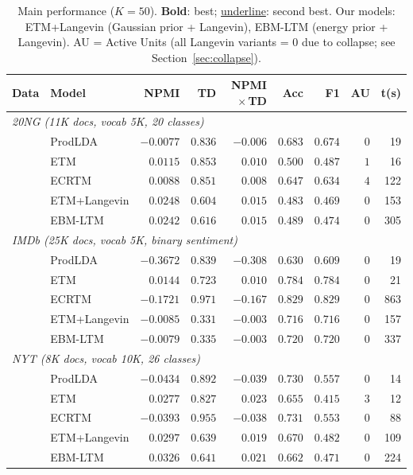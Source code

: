 \documentclass[10pt]{article}
\newcommand{\best}[1]{\textbf{#1}}
\newcommand{\second}[1]{\underline{#1}}
\begin{document}
\begin{table}[t]
\centering
\caption{Main performance ($K=50$). \best{Bold}: best; \second{underline}: second best.
Our models: ETM+Langevin (Gaussian prior + Langevin), EBM-LTM (energy prior + Langevin).
AU = Active Units (all Langevin variants = 0 due to collapse; see Section~\ref{sec:collapse}).}
\label{tab:main}
\setlength{\tabcolsep}{3.5pt}
\small
\begin{tabular}{llrrrrrrr}
\hline
\textbf{Data} & \textbf{Model} &
    \textbf{NPMI} & \textbf{TD} & \textbf{NPMI$\!\times\!$TD} &
    \textbf{Acc} & \textbf{F1} & \textbf{AU} & \textbf{t(s)} \\
\hline
\multicolumn{9}{l}{\textit{20NG (11K docs, vocab 5K, 20 classes)}} \\
  & ProdLDA      & $-0.0077$ & \second{$0.836$} & $-0.006$ & \best{$0.683$} & \best{$0.674$} & 0 & 19 \\
  & ETM          & $0.0115$  & \best{$0.853$}   & $0.010$  & $0.500$ & $0.487$ & \second{$1$} & 16 \\
  & ECRTM        & $0.0088$  & $0.851$ & $0.008$  & \second{$0.647$} & \second{$0.634$} & \best{$4$} & 122 \\
  & ETM+Langevin & \best{$0.0248$} & $0.604$ & \best{$0.015$} & $0.483$ & $0.469$ & 0 & 153 \\
  & EBM-LTM      & \second{$0.0242$} & \second{$0.616$} & \second{$0.015$} & $0.489$ & $0.474$ & 0 & 305 \\
\hline
\multicolumn{9}{l}{\textit{IMDb (25K docs, vocab 5K, binary sentiment)}} \\
  & ProdLDA      & $-0.3672$ & $0.839$ & $-0.308$ & $0.630$ & $0.609$ & 0 & 19 \\
  & ETM          & \best{$0.0144$} & $0.723$ & \best{$0.010$} & \second{$0.784$} & \second{$0.784$} & 0 & 21 \\
  & ECRTM        & $-0.1721$ & \best{$0.971$} & $-0.167$ & \best{$0.829$} & \best{$0.829$} & 0 & 863 \\
  & ETM+Langevin & \second{$-0.0085$} & $0.331$ & \second{$-0.003$} & $0.716$ & $0.716$ & 0 & 157 \\
  & EBM-LTM      & $-0.0079$ & $0.335$ & $-0.003$ & $0.720$ & $0.720$ & 0 & 337 \\
\hline
\multicolumn{9}{l}{\textit{NYT (8K docs, vocab 10K, 26 classes)}} \\
  & ProdLDA      & $-0.0434$ & $0.892$ & $-0.039$ & \best{$0.730$} & \best{$0.557$} & 0 & 14 \\
  & ETM          & $0.0277$  & \best{$0.827$} & $0.023$ & \second{$0.655$} & $0.415$ & \best{$3$} & 12 \\
  & ECRTM        & $-0.0393$ & \second{$0.955$} & $-0.038$ & $0.731$ & \second{$0.553$} & 0 & 88 \\
  & ETM+Langevin & \second{$0.0297$} & $0.639$ & \second{$0.019$} & $0.670$ & $0.482$ & 0 & 109 \\
  & EBM-LTM      & \best{$0.0326$} & $0.641$ & \best{$0.021$} & $0.662$ & $0.471$ & 0 & 224 \\
\hline
\end{tabular}
\end{table}
\end{document}

